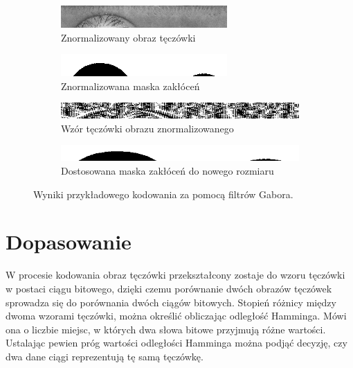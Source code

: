 \documentclass[10pt,polish,a4paper,oneside]{ppfcmthesis}
\begin{document}
\begin{figure}
  \centering
  \begin{subfigure}[b]{0.5\textwidth}
    \includegraphics[width=\textwidth]{images/encoding/norm.png}
    \caption{Znormalizowany obraz tęczówki}
  \end{subfigure}
  \begin{subfigure}[b]{0.5\textwidth}
    \includegraphics[width=\textwidth]{images/encoding/normMask.png}
    \caption{Znormalizowana maska zakłóceń}
  \end{subfigure}
  \begin{subfigure}[b]{1\textwidth}
    \includegraphics[width=\textwidth]{images/encoding/encoded.png}
    \caption{Wzór tęczówki obrazu znormalizowanego}
  \end{subfigure}
  \begin{subfigure}[b]{\textwidth}
    \includegraphics[width=\textwidth]{images/encoding/encodedMask.png}
    \caption{Dostosowana maska zakłóceń do nowego rozmiaru}
  \end{subfigure}
  \caption{Wyniki przykładowego kodowania za pomocą filtrów Gabora.}
  \label{fig:gaborExample}
\end{figure}

\section{Dopasowanie}

W procesie kodowania obraz tęczówki przekształcony zostaje do wzoru tęczówki w postaci ciągu bitowego,
dzięki czemu porównanie dwóch obrazów tęczówek sprowadza się do porównania dwóch ciągów bitowych.
Stopień różnicy między dwoma wzorami tęczówki, można określi\'c obliczając odległoś\'c Hamminga. Mówi
ona o liczbie miejsc, w których dwa słowa bitowe przyjmują różne wartości.
Ustalając pewien próg wartości odległości Hamminga można podją\'c decyzję, czy dwa dane ciągi
reprezentują tę samą tęczówkę.
\end{document}
